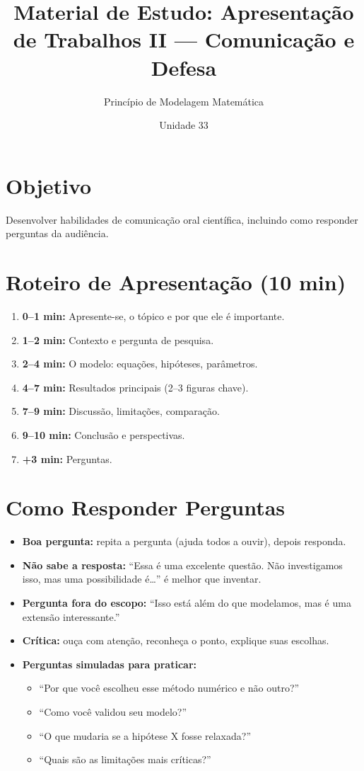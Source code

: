 \documentclass[12pt,a4paper]{article}
\title{Material de Estudo: Apresenta\c{c}\~ao de Trabalhos II --- Comunica\c{c}\~ao e Defesa}
\author{Princ\'ipio de Modelagem Matem\'atica}
\date{Unidade 33}
\begin{document}
\maketitle

\section*{Objetivo}
Desenvolver habilidades de comunica\c{c}\~ao oral cient\'ifica, incluindo como responder perguntas da audi\^encia.

\section*{Roteiro de Apresenta\c{c}\~ao (10 min)}

\begin{enumerate}
  \item \textbf{0--1 min:} Apresente-se, o t\'opico e por que ele \'e importante.
  \item \textbf{1--2 min:} Contexto e pergunta de pesquisa.
  \item \textbf{2--4 min:} O modelo: equa\c{c}\~oes, hip\'oteses, par\^ametros.
  \item \textbf{4--7 min:} Resultados principais (2--3 figuras chave).
  \item \textbf{7--9 min:} Discuss\~ao, limita\c{c}\~oes, compara\c{c}\~ao.
  \item \textbf{9--10 min:} Conclus\~ao e perspectivas.
  \item \textbf{+3 min:} Perguntas.
\end{enumerate}

\section*{Como Responder Perguntas}

\begin{itemize}
  \item \textbf{Boa pergunta:} repita a pergunta (ajuda todos a ouvir), depois responda.
  \item \textbf{N\~ao sabe a resposta:} ``Essa \'e uma excelente quest\~ao. N\~ao investigamos isso, mas uma possibilidade \'e\ldots'' \'e melhor que inventar.
  \item \textbf{Pergunta fora do escopo:} ``Isso est\'a al\'em do que modelamos, mas \'e uma extens\~ao interessante.''
  \item \textbf{Cr\'itica:} ouça com aten\c{c}\~ao, reconhe\c{c}a o ponto, explique suas escolhas.
  \item \textbf{Perguntas simuladas para praticar:}
  \begin{itemize}
    \item ``Por que voc\^e escolheu esse m\'etodo num\'erico e n\~ao outro?''
    \item ``Como voc\^e validou seu modelo?''
    \item ``O que mudaria se a hip\'otese X fosse relaxada?''
    \item ``Quais s\~ao as limita\c{c}\~oes mais cr\'iticas?''
  \end{itemize}
\end{itemize}
\end{document}
